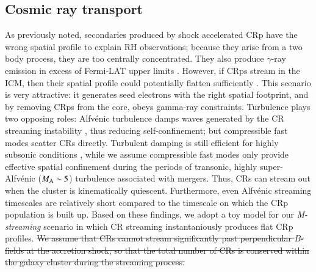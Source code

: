 \documentclass[useAMS,usenatbib]{mn2e}
\newcommand{\Mstream}{{\it M-streaming}\xspace}
\begin{document}
\subsection{Cosmic ray transport}
As previously noted, secondaries produced by shock accelerated CRp
have the wrong spatial profile to explain RH observations; because
they arise from a two body process, they are too centrally
concentrated. They also produce $\gamma$-ray emission in excess of
Fermi-LAT upper limits
\citep{2012ApJ...757..123A,brunetti12,2014ApJ...787...18A}. However,
if CRps stream in the ICM, then their spatial profile could
potentially flatten sufficiently \citep{ensslin11,wiener13}. This
scenario is very attractive: it generates seed electrons with the
right spatial footprint, and by removing CRps from the core, obeys
gamma-ray constraints. Turbulence plays two opposing roles:
Alfv{\'e}nic turbulence damps waves generated by the CR streaming
instability \citep{yan02,farmer04}, thus reducing self-confinement;
but compressible fast modes scatter CRs directly. Turbulent damping is
still efficient for highly subsonic conditions \citep{wiener13}, while
we assume compressible fast modes only provide effective spatial
confinement during the periods of transonic, highly super-Alfv{\'e}nic
($M_{\rm A} \sim 5$) turbulence associated with mergers. Thus, CRs can
stream out when the cluster is kinematically quiescent. Furthermore,
even Alfv{\'e}nic streaming timescales are relatively short
\cite[$\sim 0.1-0.5$ Gyr;][]{wiener13} compared to the timescale on
which the CRp population is built up. Based on these findings, we
adopt a toy model for our \Mstream scenario in which CR streaming
instantaniously produces flat CRp profiles. \sout{We assume that CRs cannot
stream significantly past perpendicular $B$-fields at the accretion
shock, so that the total number of CRs is conserved within the galaxy
cluster during the streaming process.}
\end{document}
